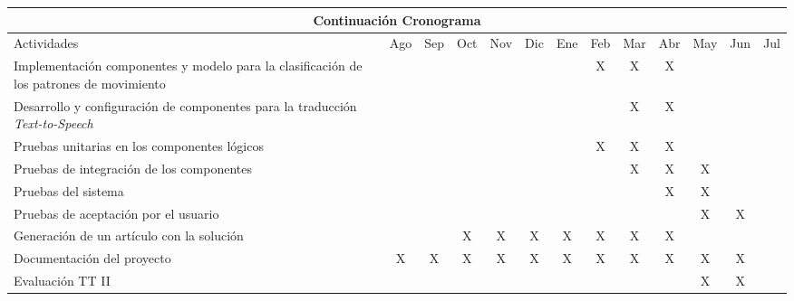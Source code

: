 \begin{tabular}{|p{2.5cm}|c|c|c|c|c|c|c|c|c|c|c|c|}
	\hline \hline
	\multicolumn{13}{|c|}{Continuación Cronograma} \\ \hline \hline
	Actividades & Ago & Sep & Oct & Nov & Dic & Ene & Feb & Mar & Abr & May & Jun & Jul \\ \hline
	Implementación componentes y modelo para la clasificación de los patrones de movimiento &  &  &  &  &  &  & X & X & X & & & \\ \hline
	Desarrollo y configuración de componentes para la traducción \textit{Text-to-Speech} &  &  &  &  &  &  &  & X & X &  & & \\ \hline
	Pruebas unitarias en los componentes lógicos &  &  &  &  &  & & X & X & X &  & & \\ \hline
	Pruebas de integración de los componentes &  &  &  &  &  &  &  & X & X  & X & & \\ \hline
	Pruebas del sistema &  &  &  &  &  &  &  &  & X & X & & \\ \hline
	Pruebas de aceptación por el usuario &  &  &  &  &  &  &  &  &  & X & X &  \\ \hline
	Generación de un artículo con la solución &  &  & X & X & X & X & X & X & X & & & \\ \hline
	Documentación del proyecto & X & X & X & X & X & X & X & X & X & X & X & \\ \hline
	Evaluación TT II &  &  &  &  &  &  &  &  &  & X & X & \\ \hline
\end{tabular}